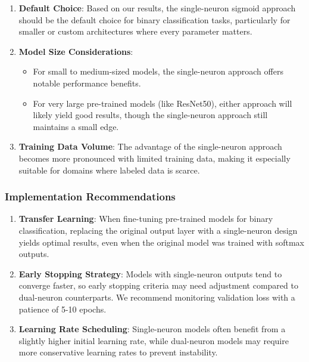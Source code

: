 \begin{enumerate}
\item \textbf{Default Choice}: Based on our results, the single-neuron sigmoid approach should be the default choice for binary classification tasks, particularly for smaller or custom architectures where every parameter matters.

\item \textbf{Model Size Considerations}: 
   \begin{itemize}
   \item For small to medium-sized models, the single-neuron approach offers notable performance benefits.
   \item For very large pre-trained models (like ResNet50), either approach will likely yield good results, though the single-neuron approach still maintains a small edge.
   \end{itemize}

\item \textbf{Training Data Volume}: The advantage of the single-neuron approach becomes more pronounced with limited training data, making it especially suitable for domains where labeled data is scarce.
\end{enumerate}

\subsubsection{Implementation Recommendations}

\begin{enumerate}
\item \textbf{Transfer Learning}: When fine-tuning pre-trained models for binary classification, replacing the original output layer with a single-neuron design yields optimal results, even when the original model was trained with softmax outputs.

\item \textbf{Early Stopping Strategy}: Models with single-neuron outputs tend to converge faster, so early stopping criteria may need adjustment compared to dual-neuron counterparts. We recommend monitoring validation loss with a patience of 5-10 epochs.

\item \textbf{Learning Rate Scheduling}: Single-neuron models often benefit from a slightly higher initial learning rate, while dual-neuron models may require more conservative learning rates to prevent instability.
\end{enumerate}

